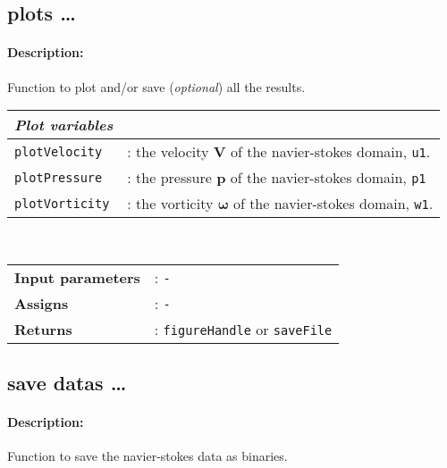 \subsection{plots \ldots}
	\paragraph{Description:} Function to plot and/or save (\textit{optional}) all the results.\\
	
		\begin{tabular}{lp{10cm}}
			\textit{Plot variables} & \\ \hline
			\texttt{plotVelocity} &: the velocity $\mathbf{V}$ of the navier-stokes domain, \texttt{u1}.\\ 
			\texttt{plotPressure} &: the pressure $\mathbf{p}$ of the navier-stokes domain, \texttt{p1}\\ 
			\texttt{plotVorticity} &: the vorticity $\mathbf{\omega}$ of the navier-stokes domain, \texttt{w1}.\\ 
		\end{tabular} \vspace{5 mm}
	\\
	\begin{tabular}{lp{10cm}}
		\textbf{Input parameters} &: \texttt{-}\\ 
		\textbf{Assigns} &: \texttt{-}\\ 			
		\textbf{Returns} &: \texttt{figureHandle} or \texttt{saveFile}\\ 					
	\end{tabular}

\subsection{save datas \ldots}
	\paragraph{Description:} Function to save the navier-stokes data as binaries.\\
	
